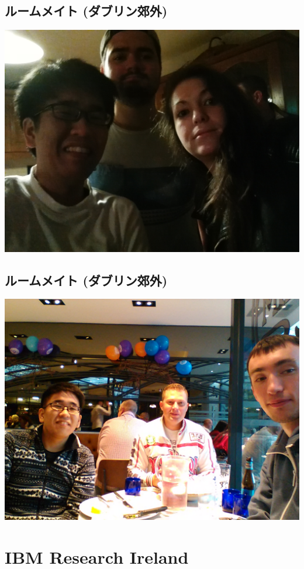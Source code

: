 \subsection{ルームメイト (ダブリン郊外)}
\label{sec-7-6}

\includegraphics{img/static/iralia.jpg}

\subsection{ルームメイト (ダブリン郊外)}
\label{sec-7-7}

\includegraphics{img/static/andrei.jpg}

\section{IBM Research Ireland}
\label{sec-8}

